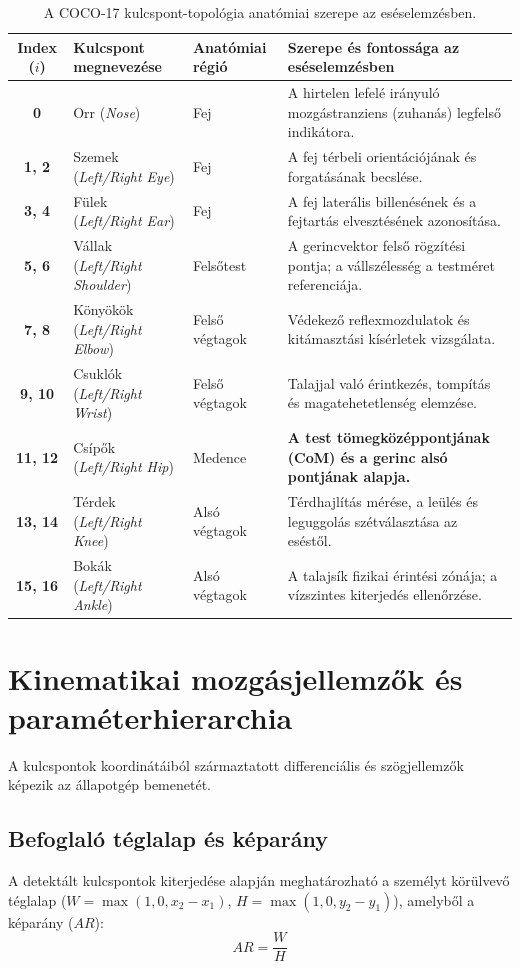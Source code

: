 \documentclass[12pt,a4paper,oneside]{report}
\begin{document}
\begin{table}[H]
\centering
\small
\begin{tabularx}{\textwidth}{cllX}
\toprule
\textbf{Index ($i$)} & \textbf{Kulcspont megnevezése} & \textbf{Anatómiai régió} & \textbf{Szerepe és fontossága az eséselemzésben} \\
\midrule
\textbf{0} & Orr (\textit{Nose}) & Fej & A hirtelen lefelé irányuló mozgástranziens (zuhanás) legfelső indikátora. \\
\textbf{1, 2} & Szemek (\textit{Left/Right Eye}) & Fej & A fej térbeli orientációjának és forgatásának becslése. \\
\textbf{3, 4} & Fülek (\textit{Left/Right Ear}) & Fej & A fej laterális billenésének és a fejtartás elvesztésének azonosítása. \\
\textbf{5, 6} & Vállak (\textit{Left/Right Shoulder}) & Felsőtest & A gerincvektor felső rögzítési pontja; a vállszélesség a testméret referenciája. \\
\textbf{7, 8} & Könyökök (\textit{Left/Right Elbow}) & Felső végtagok & Védekező reflexmozdulatok és kitámasztási kísérletek vizsgálata. \\
\textbf{9, 10} & Csuklók (\textit{Left/Right Wrist}) & Felső végtagok & Talajjal való érintkezés, tompítás és magatehetetlenség elemzése. \\
\textbf{11, 12} & Csípők (\textit{Left/Right Hip}) & Medence & \textbf{A test tömegközéppontjának (CoM) és a gerinc alsó pontjának alapja.} \\
\textbf{13, 14} & Térdek (\textit{Left/Right Knee}) & Alsó végtagok & Térdhajlítás mérése, a leülés és leguggolás szétválasztása az eséstől. \\
\textbf{15, 16} & Bokák (\textit{Left/Right Ankle}) & Alsó végtagok & A talajsík fizikai érintési zónája; a vízszintes kiterjedés ellenőrzése. \\
\bottomrule
\end{tabularx}
\caption{A COCO-17 kulcspont-topológia anatómiai szerepe az eséselemzésben.}
\label{tab:coco_keypoints}
\end{table}

\section{Kinematikai mozgásjellemzők és paraméterhierarchia}
A kulcspontok koordinátáiból származtatott differenciális és szögjellemzők képezik az állapotgép bemenetét.

\subsection{Befoglaló téglalap és képarány}
A detektált kulcspontok kiterjedése alapján meghatározható a személyt körülvevő téglalap ($W = \max(1{,}0, x_2 - x_1)$, $H = \max(1{,}0, y_2 - y_1)$), amelyből a képarány ($AR$):
\begin{equation}
    AR = \frac{W}{H}
\end{equation}
\end{document}
